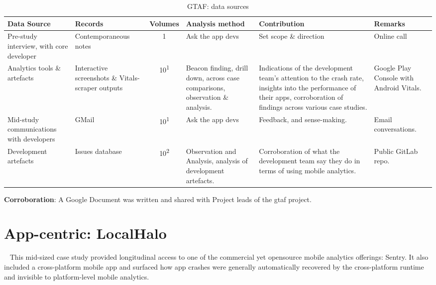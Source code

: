 \begin{table*}
    \centering
    \footnotesize
    \tabcolsep=0.12cm
    \begin{tabular}{L{2.6cm} L{2.4cm} c L{2.75cm} L{3.75cm} L{2cm}}
        Data Source & Records & Volumes & Analysis method &Contribution & Remarks \\
        \toprule
         Pre-study interview, with core developer & Contemporaneous notes\footnotemark & 1 & Ask the app devs & Set scope \& direction & Online call \\
         Analytics tools \& artefacts &Interactive screenshots \& Vitals-scraper outputs &10\textsuperscript{1} & Beacon finding, drill down, across case comparisons, observation \& analysis. & Indications of the development team's attention to the crash rate, insights into the performance of their apps, corroboration of findings across various case studies. & Google Play Console with Android Vitals. \\         
         Mid-study communications with developers & GMail & 10\textsuperscript{1} & Ask the app devs & Feedback, and sense-making.  & Email conversations. \\
         Development artefacts  & Issues database & 10\textsuperscript{2} & Observation and Analysis, analysis of development artefacts. & Corroboration of what the development team say they do in terms of using mobile analytics. & Public GitLab repo. \\
         \bottomrule
    \end{tabular}
    \caption{GTAF: data sources}
    \label{tab:gtaf-data-sources}
\end{table*}

\textbf{Corroboration}:  A Google Document was written and shared with Project leads of the \acrfull{gtaf} project.





\section{App-centric: LocalHalo}~\label{case-study-overview-localhalo}
This mid-sized case study provided longitudinal access to one of the commercial yet opensource mobile analytics offerings: Sentry. It also included a cross-platform mobile app and surfaced how app crashes were generally automatically recovered by the cross-platform runtime and invisible to platform-level mobile analytics.

